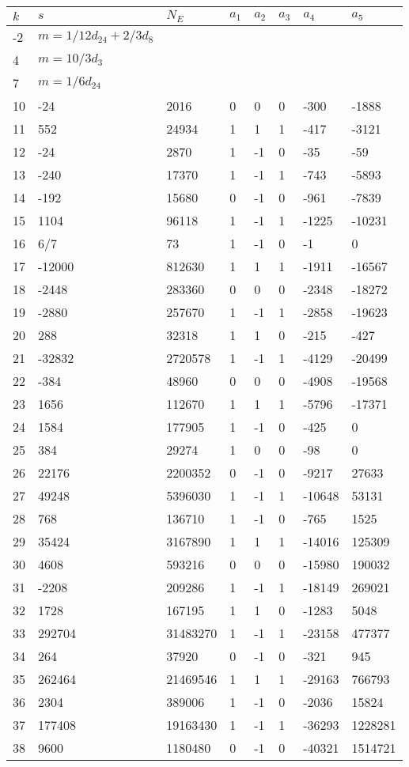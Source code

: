 \documentclass{amsart}
\begin{document}
\begin{longtable}{|l|l|l|lllll|}
\hline
$k$ & $s$ & $N_E$ & $a_1$ & $a_2$ & $a_3$ & $a_4$ & $a_5$\\
\hline
-2&$m=1/12d_{24}+2/3d_{8}$&&\multicolumn{5}{c|}{}\\
4&$m=10/3d_{3}$&&\multicolumn{5}{c|}{}\\
7&$m=1/6d_{24}$&&\multicolumn{5}{c|}{}\\
10&-24&2016&0&0&0&-300&-1888\\
11&552&24934&1&1&1&-417&-3121\\
12&-24&2870&1&-1&0&-35&-59\\
13&-240&17370&1&-1&1&-743&-5893\\
14&-192&15680&0&-1&0&-961&-7839\\
15&1104&96118&1&-1&1&-1225&-10231\\
16&6/7&73&1&-1&0&-1&0\\
17&-12000&812630&1&1&1&-1911&-16567\\
18&-2448&283360&0&0&0&-2348&-18272\\
19&-2880&257670&1&-1&1&-2858&-19623\\
20&288&32318&1&1&0&-215&-427\\
21&-32832&2720578&1&-1&1&-4129&-20499\\
22&-384&48960&0&0&0&-4908&-19568\\
23&1656&112670&1&1&1&-5796&-17371\\
24&1584&177905&1&-1&0&-425&0\\
25&384&29274&1&0&0&-98&0\\
26&22176&2200352&0&-1&0&-9217&27633\\
27&49248&5396030&1&-1&1&-10648&53131\\
28&768&136710&1&-1&0&-765&1525\\
29&35424&3167890&1&1&1&-14016&125309\\
30&4608&593216&0&0&0&-15980&190032\\
31&-2208&209286&1&-1&1&-18149&269021\\
32&1728&167195&1&1&0&-1283&5048\\
33&292704&31483270&1&-1&1&-23158&477377\\
34&264&37920&0&-1&0&-321&945\\
35&262464&21469546&1&1&1&-29163&766793\\
36&2304&389006&1&-1&0&-2036&15824\\
37&177408&19163430&1&-1&1&-36293&1228281\\
38&9600&1180480&0&-1&0&-40321&1514721\\

\end{longtable}
\end{document}
